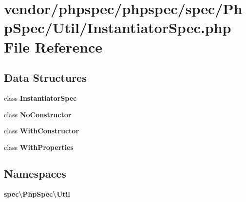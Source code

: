 \section{vendor/phpspec/phpspec/spec/\+Php\+Spec/\+Util/\+Instantiator\+Spec.php File Reference}
\label{_instantiator_spec_8php}
\subsection*{Data Structures}
\begin{DoxyCompactItemize}
\item 
class {\bf Instantiator\+Spec}
\item 
class {\bf No\+Constructor}
\item 
class {\bf With\+Constructor}
\item 
class {\bf With\+Properties}
\end{DoxyCompactItemize}
\subsection*{Namespaces}
\begin{DoxyCompactItemize}
\item 
 {\bf spec\textbackslash{}\+Php\+Spec\textbackslash{}\+Util}
\end{DoxyCompactItemize}
